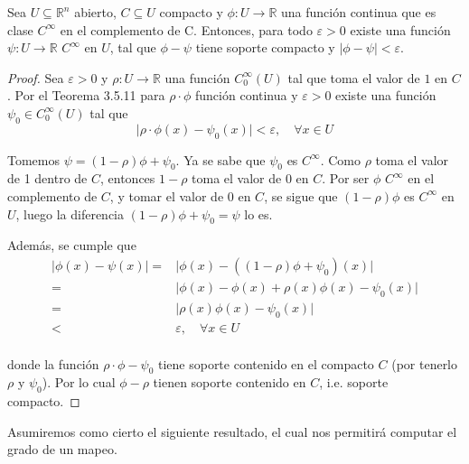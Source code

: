 \documentclass[12pt]{report}
\theoremstyle{largebreak}
\newcommand\abs[1]{\ensuremath{\lvert#1\rvert}}
\newcommand\cf[3]{\ensuremath{#1:#2\rightarrow#3}}
\begin{document}
\setcounter{section}{6}
\setcounter{lema}{14}

\begin{lema}
    Sea $U\subseteq\mathbb{R}^n$ abierto, $C\subseteq U$ compacto y $\cf{\phi}{U}{\mathbb{R}}$ una función continua que es clase $C^{\infty}$ en el complemento de C. Entonces, para todo $\varepsilon > 0$ existe una función $\cf{\psi}{U}{\mathbb{R}}$ $C^{\infty}$ en $U$, tal que $\phi - \psi$ tiene soporte compacto y $\abs{\phi - \psi}<\varepsilon$.
\end{lema}

\begin{proof}
    Sea $\varepsilon>0$ y $\cf{\rho}{U}{\mathbb{R}}$ una función $C_0^{\infty}(U)$ tal que toma el valor de $1$ en $C$. Por el Teorema 3.5.11 para $\rho\cdot\phi$ función continua y $\varepsilon>0$ existe una función $\psi_0\in C^{\infty}_{0}(U)$ tal que
    \begin{equation*}
        \abs{\rho\cdot\phi(x)-\psi_0(x)}<\varepsilon,\quad\forall x\in U
    \end{equation*}

    Tomemos $\psi=\left(1-\rho\right)\phi+\psi_0$. Ya se sabe que $\psi_0$ es $C^\infty$. Como $\rho$ toma el valor de 1 dentro de $C$, entonces $1-\rho$ toma el valor de $0$ en $C$. Por ser $\phi$ $C^\infty$ en el complemento de $C$, y tomar el valor de $0$ en $C$, se sigue que $\left(1-\rho\right)\phi$ es $C^\infty$ en $U$, luego la diferencia $\left(1-\rho\right)\phi+\psi_0=\psi$ lo es.

    Además, se cumple que
    \begin{equation*}
        \begin{split}
            \abs{\phi(x)-\psi(x)}=&\abs{\phi(x)-\left(\left(1-\rho\right)\phi+\psi_0\right)(x)}\\
            =&\abs{\phi(x)-\phi(x)+\rho(x)\phi(x)-\psi_0(x)}\\
            =&\abs{\rho(x)\phi(x)-\psi_0(x)}\\
            <&\varepsilon,\quad\forall x\in U\\
        \end{split}
    \end{equation*}
    
    donde la función $\rho\cdot\phi-\psi_0$ tiene soporte contenido en el compacto $C$ (por tenerlo $\rho$ y $\psi_0$). Por lo cual $\phi-\rho$ tienen soporte contenido en $C$, i.e. soporte compacto. 
\end{proof}

Asumiremos como cierto el siguiente resultado, el cual nos permitirá computar el grado de un mapeo.
\end{document}
